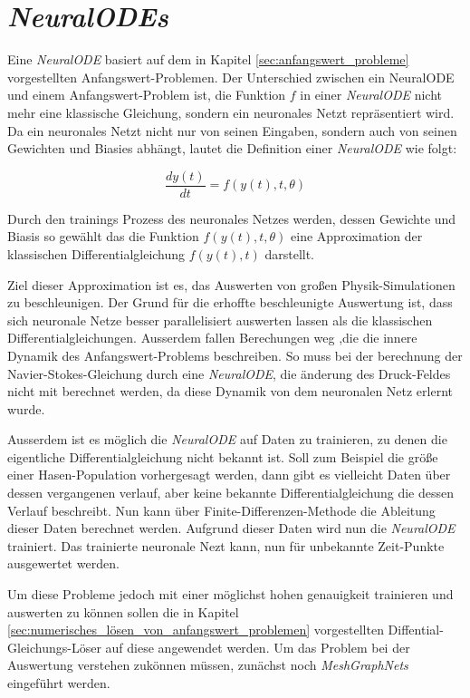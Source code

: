 
\section{\textit{NeuralODEs}} \label{sec:neural_ode}

Eine \textit{NeuralODE} \cite{neuralode} basiert auf dem in Kapitel \ref{sec:anfangswert_probleme} vorgestellten Anfangswert-Problemen.
Der Unterschied zwischen ein NeuralODE und einem Anfangswert-Problem ist, 
die Funktion $f$ in einer \textit{NeuralODE} nicht mehr eine klassische Gleichung, sondern ein 
neuronales Netzt repräsentiert wird.
Da ein neuronales Netzt nicht nur von seinen Eingaben, sondern auch von seinen Gewichten und Biasies abhängt,
lautet die Definition einer \textit{NeuralODE} wie folgt:

$$
\frac{d y(t)}{dt} = f(y(t), t, \theta)
$$

Durch den trainings Prozess des neuronales Netzes werden, dessen Gewichte und Biasis 
so gewählt das die Funktion $f(y(t), t, \theta)$ eine Approximation der klassischen Differentialgleichung 
$f(y(t), t)$ darstellt.

Ziel dieser Approximation ist es, das Auswerten von großen Physik-Simulationen zu beschleunigen.
Der Grund für die erhoffte beschleunigte Auswertung ist, dass sich neuronale Netze besser parallelisiert auswerten lassen
als die klassischen Differentialgleichungen.
Ausserdem fallen Berechungen weg ,die die innere Dynamik des Anfangswert-Problems beschreiben.
So muss bei der berechnung der Navier-Stokes-Gleichung durch eine \textit{NeuralODE}, die änderung des Druck-Feldes 
nicht mit berechnet werden, da diese Dynamik von dem neuronalen Netz erlernt wurde.

Ausserdem ist es möglich die \textit{NeuralODE} auf Daten zu trainieren, 
zu denen die eigentliche Differentialgleichung nicht bekannt ist.
Soll zum Beispiel die größe einer Hasen-Population vorhergesagt werden, dann gibt es vielleicht Daten über dessen 
vergangenen verlauf, aber keine bekannte Differentialgleichung die dessen Verlauf beschreibt.
Nun kann über Finite-Differenzen-Methode die Ableitung dieser Daten berechnet werden.
Aufgrund dieser Daten wird nun die \textit{NeuralODE} trainiert.
Das trainierte neuronale Nezt kann, nun für unbekannte Zeit-Punkte ausgewertet werden.

Um diese Probleme jedoch mit einer möglichst hohen genauigkeit trainieren und auswerten zu können
sollen die in Kapitel \ref{sec:numerisches_lösen_von_anfangswert_problemen} vorgestellten Diffential-Gleichungs-Löser auf diese angewendet werden.
Um das Problem bei der Auswertung verstehen zukönnen müssen, zunächst noch \textit{MeshGraphNets} eingeführt werden.

